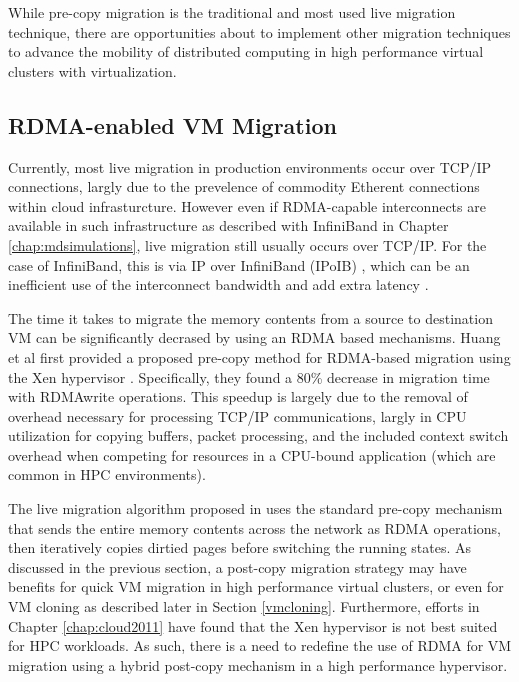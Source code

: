 While pre-copy migration is the traditional and most used live migration technique, there are opportunities about to implement other migration techniques to advance the mobility of distributed computing in high performance virtual clusters with virtualization. 



\subsection{RDMA-enabled VM Migration}

Currently, most live migration in production environments occur over TCP/IP connections, largly due to the prevelence of commodity Etherent connections within cloud infrasturcture. However even if RDMA-capable interconnects are available in such infrastructure as described with InfiniBand in Chapter \ref{chap:mdsimulations}, live migration still usually occurs over TCP/IP. For the case of InfiniBand, this is via IP over InfiniBand (IPoIB) \cite{chu2006ipoib}, which can be an inefficient use of the interconnect bandwidth and add extra latency \cite{yu2008performance}. 

The time it takes to migrate the memory contents from a source to destination VM can be significantly decrased by using an RDMA based mechanisms. Huang et al first provided a proposed pre-copy method for RDMA-based migration using the Xen hypervisor \cite{huang2007high}. Specifically, they found a 80\% decrease in migration time with RDMAwrite operations. This speedup is largely due to the removal of overhead necessary for processing TCP/IP communications, largly in CPU utilization for copying buffers, packet processing, and the included context switch overhead when competing for resources in a CPU-bound application (which are common in HPC environments). 

The live migration algorithm proposed in \cite{huang2007high} uses the standard pre-copy mechanism that sends the entire memory contents across the network as RDMA operations, then iteratively copies dirtied pages before switching the running states.  As discussed in the previous section, a post-copy migration strategy may have benefits for quick VM migration in high performance virtual clusters, or even for VM cloning as described later in Section \ref{vmcloning}. Furthermore, efforts in Chapter \ref{chap:cloud2011} have found that the Xen hypervisor is not best suited for HPC workloads.  As such, there is a need to redefine the use of RDMA for VM migration using a hybrid post-copy mechanism in a high performance hypervisor.   

